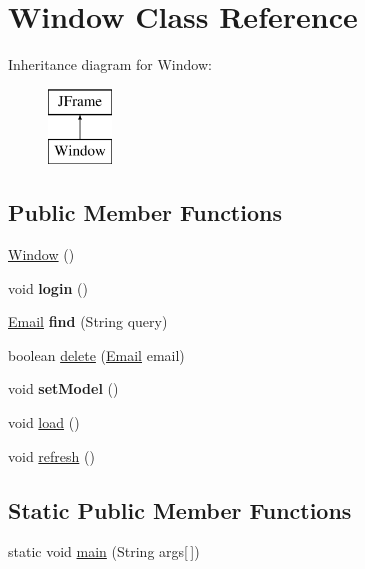 \hypertarget{class_window}{}\section{Window Class Reference}
\label{class_window}
Inheritance diagram for Window\+:\begin{figure}[H]
\begin{center}
\leavevmode
\includegraphics[height=2.000000cm]{class_window}
\end{center}
\end{figure}
\subsection*{Public Member Functions}
\begin{DoxyCompactItemize}
\item 
\hyperlink{class_window_ad0552903a3d5b009c0d882f9ad2571ff}{Window} ()
\item 
\mbox{\label{class_window_a0e9b9530fdbae1642ce5f2295160e1af}} 
void {\bfseries login} ()
\item 
\mbox{\label{class_window_a487c2744165f9a1d1713a8396ccd3eb1}} 
\hyperlink{class_email}{Email} {\bfseries find} (String query)
\item 
boolean \hyperlink{class_window_a483632edb0590ebb925da330fd422e2f}{delete} (\hyperlink{class_email}{Email} email)
\item 
\mbox{\label{class_window_a94fab70145669e0c370c1cd40f9373e3}} 
void {\bfseries set\+Model} ()
\item 
void \hyperlink{class_window_ab76a4c258774324cbd2559a912c8d89b}{load} ()
\item 
void \hyperlink{class_window_ae0c2bf00a564beb8f03ee2ae97a4feb5}{refresh} ()
\end{DoxyCompactItemize}
\subsection*{Static Public Member Functions}
\begin{DoxyCompactItemize}
\item 
static void \hyperlink{class_window_a95602e95a687fa2069944650a01d780e}{main} (String args\mbox{[}$\,$\mbox{]})
\end{DoxyCompactItemize}


